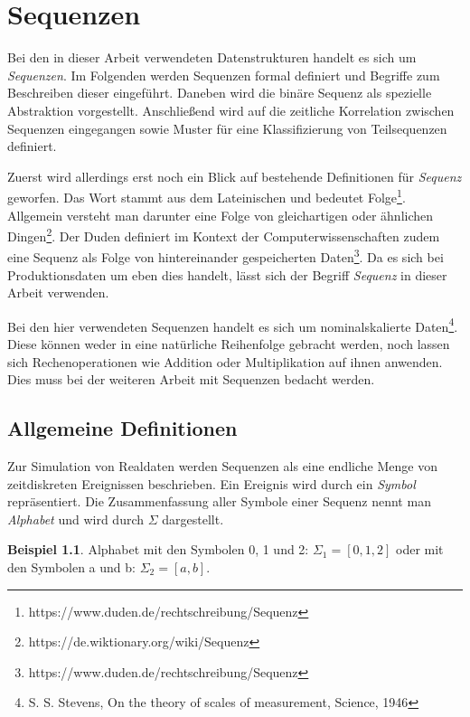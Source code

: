 \theoremstyle{definition}
\newtheorem{theorem}{Beispiel}[section]

\chapter{Sequenzen}
\label{chp:sequences}
Bei den in dieser Arbeit verwendeten Datenstrukturen handelt es sich um \textit{Sequenzen}. Im Folgenden werden Sequenzen formal definiert und Begriffe zum Beschreiben dieser eingeführt. Daneben wird die binäre Sequenz als spezielle Abstraktion vorgestellt. Anschließend wird auf die zeitliche Korrelation zwischen Sequenzen eingegangen sowie Muster für eine Klassifizierung von Teilsequenzen definiert.

Zuerst wird allerdings erst noch ein Blick auf bestehende Definitionen für \textit{Sequenz} geworfen. Das Wort stammt aus dem Lateinischen und bedeutet Folge\footnote{https://www.duden.de/rechtschreibung/Sequenz}. Allgemein versteht man darunter eine Folge von gleichartigen oder ähnlichen Dingen\footnote{https://de.wiktionary.org/wiki/Sequenz}. Der Duden definiert im Kontext der Computerwissenschaften zudem eine Sequenz als Folge von hintereinander gespeicherten Daten\footnote{https://www.duden.de/rechtschreibung/Sequenz}. Da es sich bei Produktionsdaten um eben dies handelt, lässt sich der Begriff \textit{Sequenz} in dieser Arbeit verwenden. 

Bei den hier verwendeten Sequenzen handelt es sich um nominalskalierte Daten\footnote{S. S. Stevens, On the theory of scales of measurement, Science, 1946}. Diese können weder in eine natürliche Reihenfolge gebracht werden, noch lassen sich Rechenoperationen wie Addition oder Multiplikation auf ihnen anwenden. Dies muss bei der weiteren Arbeit mit Sequenzen bedacht werden.

\section{Allgemeine Definitionen}
\label{chp:definitions-sequences}
Zur Simulation von Realdaten werden Sequenzen als eine endliche Menge von zeitdiskreten Ereignissen beschrieben. Ein Ereignis wird durch ein \textit{Symbol} repräsentiert. Die Zusammenfassung aller  Symbole einer Sequenz nennt man \textit{Alphabet} und wird durch $\Sigma$ dargestellt.

\begin{theorem}
Alphabet mit den Symbolen 0, 1 und 2: $\Sigma_1 = [0,1,2]$ oder mit den Symbolen a und b: $\Sigma_2 = [a,b]$. 
\end{theorem}

